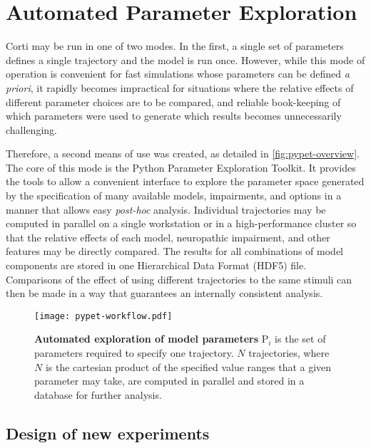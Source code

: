 \section{Automated Parameter Exploration} %
\label{sub:automated_parameter_exploration}
Corti may be run in one of two modes.  In the first, a single set of parameters defines a single trajectory and the model is run once.   However, while this mode of operation is convenient for fast simulations whose parameters can be defined \emph{a priori}, it rapidly becomes impractical for situations where the relative effects of different parameter choices are to be compared, and reliable book-keeping of which parameters were used to generate which results becomes unnecessarily challenging.

Therefore, a second means of use was created, as detailed in \autoref{fig:pypet-overview}. The core of this mode is the Python Parameter Exploration Toolkit\citep{Meyer2016Pypet}. It provides the tools to allow a convenient interface to explore the parameter space generated by the specification of many available models, impairments, and options in a manner that allows easy \emph{post-hoc} analysis. Individual trajectories may be computed in parallel on a single workstation or in a high-performance cluster so that the relative effects of each model, neuropathic impairment, and other features may be directly compared.  The results for all combinations of model components are stored in one Hierarchical Data Format (HDF5) file.  Comparisons of the effect of using different trajectories to the same stimuli can then be made in a way that guarantees an internally consistent analysis.


\begin{figure}[htbp]
	\centering
	\texttt{[image: pypet-workflow.pdf]}
	\caption[Automated exploration of model parameters]{\textbf{Automated exploration of model parameters} P$_i$ is the set of parameters required to specify one trajectory.  $N$ trajectories, where $N$ is the cartesian product of the specified value ranges that a given parameter may take, are computed in parallel and stored in a database for further analysis. }
	\label{fig:pypet-overview}
\end{figure}
\subsection{Design of new experiments} %
\label{sub:design_of_new_experiments}


